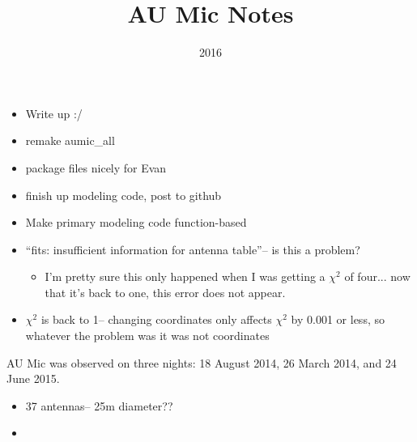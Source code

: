 \documentclass[a4paper]{tufte-handout}
\title{AU Mic Notes}
\date{2016}
\begin{document}
\maketitle


\begin{tasks}
    \begin{itemize}
      \item Write up :/
      \item remake aumic\_all
      \item package files nicely for Evan
      \item finish up modeling code, post to github
    \end{itemize}
\end{tasks}


\begin{maybe}
    \begin{itemize}
      \item Make primary modeling code function-based
    \end{itemize}
\end{maybe}


\begin{mer}
    \begin{itemize}
      \item ``fits: insufficient information for antenna table''-- is this a problem?
      \begin{itemize}
        \item I'm pretty sure this only happened when I was getting a $\chi^2$ of four... now that it's back to one, this error does not appear.
      \end{itemize}
      \item $\chi^2$ is back to 1-- changing coordinates only affects $\chi^2$ by 0.001 or less, so whatever the problem was it was not coordinates
    \end{itemize}

\end{mer}

AU Mic was observed on three nights: 18 August 2014, 26 March 2014, and 24 June 2015.
\begin{itemize}
  \item 37 antennas-- 25m diameter??
  \item
\end{itemize}
\end{document}
